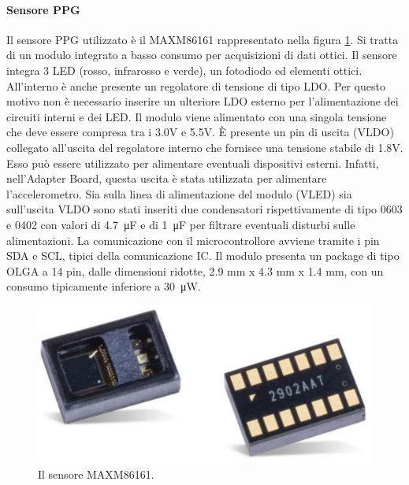 \paragraph{Sensore PPG} Il sensore PPG utilizzato è il MAXM86161 rappresentato nella figura \ref{fig:ImmagineMAXM86161}.
Si tratta di un modulo integrato a basso consumo per acquisizioni di dati ottici. Il sensore integra 3 LED (rosso, infrarosso e verde), un fotodiodo ed elementi ottici. All'interno è anche presente un regolatore di tensione di tipo LDO. Per questo motivo non è necessario inserire un ulteriore LDO esterno per l'alimentazione dei circuiti interni e dei LED. Il modulo viene alimentato con una singola tensione che deve essere compresa tra i 3.0V e 5.5V. \`E presente un pin di uscita (VLDO) collegato all'uscita del regolatore interno che fornisce una tensione stabile di 1.8V. Esso può essere utilizzato per alimentare eventuali dispositivi esterni. Infatti, nell'Adapter Board, questa uscita è stata utilizzata per alimentare l'accelerometro. Sia sulla linea di alimentazione del modulo (VLED) sia sull'uscita VLDO sono stati inseriti due condensatori rispettivamente di tipo 0603 e 0402 con valori di \SI{4.7}{\micro\farad} e di \SI{1}{\micro\farad} per filtrare eventuali disturbi sulle alimentazioni. La comunicazione con il microcontrollore avviene tramite i pin SDA e SCL, tipici della comunicazione IC. Il modulo presenta un package di tipo OLGA a 14 pin, dalle dimensioni ridotte, 2.9 mm x 4.3 mm x 1.4 mm, con un consumo tipicamente inferiore a \SI{30}{\micro\watt}.
\begin{figure}[h]
	\centering
	\includegraphics[width=0.6\linewidth]{ImageFiles/Hardware/ImmagineMAXM86161}
	\caption{Il sensore MAXM86161.}
	\label{fig:ImmagineMAXM86161}
\end{figure}

